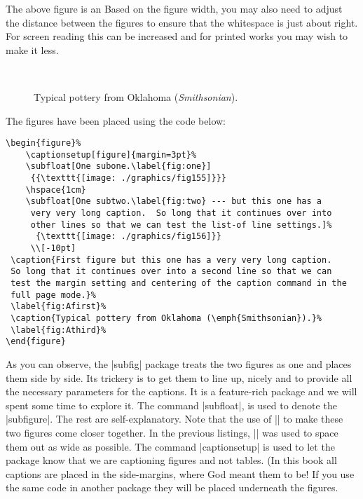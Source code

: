 The above figure is an Based on the figure width, you may also need to adjust the distance between the figures to ensure that the whitespace is just about right. For screen reading this can be increased and for printed works you may wish to make it less.


\begin{figure}[htp]%
    \captionsetup[figure]{margin=3pt}%
    \hspace{1cm}
     \\[-10pt]
    \caption{First figure --- but this one has a very very long caption.
     So long that it continues over into a second line so that we can
     test the margin setting and centering of the caption command in the
     full page mode.}%
    \label{fig:Afirst}%
    \caption{Typical pottery from Oklahoma (\emph{Smithsonian}).}%
    \label{fig:Athird}%
\end{figure}


The figures have been placed using the code below:

\begin{verbatim}
\begin{figure}%
    \captionsetup[figure]{margin=3pt}%
    \subfloat[One subone.\label{fig:one}]
     {{\texttt{[image: ./graphics/fig155]}}}
    \hspace{1cm}
    \subfloat[One subtwo.\label{fig:two} --- but this one has a
     very very long caption.  So long that it continues over into
     other lines so that we can test the list-of line settings.]%
      {\texttt{[image: ./graphics/fig156]}}
     \\[-10pt]
 \caption{First figure but this one has a very very long caption.
 So long that it continues over into a second line so that we can
 test the margin setting and centering of the caption command in the
 full page mode.}%
 \label{fig:Afirst}%
 \caption{Typical pottery from Oklahoma (\emph{Smithsonian}).}%
 \label{fig:Athird}%
\end{figure}
\end{verbatim}

As you can observe, the |subfig| package treats the two figures as one and places them side by side. Its trickery is to get them to line up, nicely and to provide all the necessary parameters for the captions. It is a feature-rich package and we will spent some time to explore it. The command |subfloat|, is used to denote the |subfigure|. The rest are self-explanatory. Note that the use of |\hspace{1cm}| to make these two figures come closer together. In the previous listings, |\hfill| was used to space them out as wide as possible. The command |captionsetup| is used to let the package know that we are captioning figures and not tables. (In this book all captions are placed in the side-margins, where God meant them to be! If you use the same code in another package they will be placed underneath the figures.
